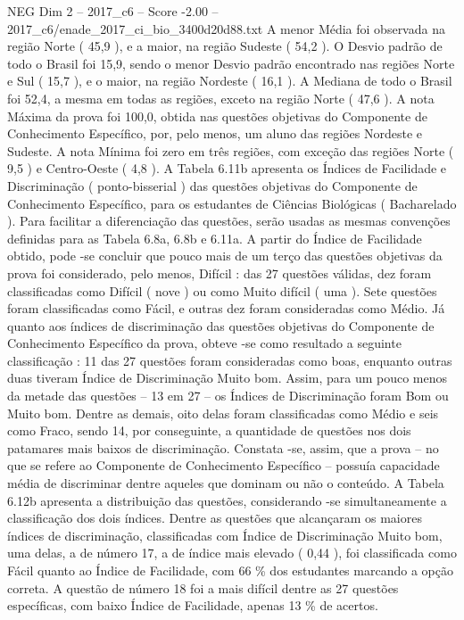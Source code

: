 \begin{textsample}{NEG Dim 2 – 2017\_c6 – Score -2.00 – 2017\_c6/enade\_2017\_ci\_bio\_3400d20d88.txt}
A menor Média foi observada na região Norte ( 45,9 ), e a maior, na região Sudeste ( 54,2 ).
O Desvio padrão de todo o Brasil foi 15,9, sendo o menor Desvio padrão encontrado nas regiões Norte e Sul ( 15,7 ), e o maior, na região Nordeste ( 16,1 ).
A Mediana de todo o Brasil foi 52,4, a mesma em todas as regiões, exceto na região Norte ( 47,6 ).
A nota Máxima da prova foi 100,0, obtida nas questões objetivas do Componente de Conhecimento Específico, por, pelo menos, um aluno das regiões Nordeste e Sudeste.
A nota Mínima foi zero em três regiões, com exceção das regiões Norte ( 9,5 ) e Centro-Oeste ( 4,8 ).
A Tabela 6.11b apresenta os Índices de Facilidade e Discriminação ( ponto-bisserial ) das questões objetivas do Componente de Conhecimento Específico, para os estudantes de Ciências Biológicas ( Bacharelado ).
Para facilitar a diferenciação das questões, serão usadas as mesmas convenções definidas para as Tabela 6.8a, 6.8b e 6.11a.
A partir do Índice de Facilidade obtido, pode -se concluir que pouco mais de um terço das questões objetivas da prova foi considerado, pelo menos, Difícil : das 27 questões válidas, dez foram classificadas como Difícil ( nove ) ou como Muito difícil ( uma ).
Sete questões foram classificadas como Fácil, e outras dez foram consideradas como Médio.
Já quanto aos índices de discriminação das questões objetivas do Componente de Conhecimento Específico da prova, obteve -se como resultado a seguinte classificação : 11 das 27 questões foram consideradas como boas, enquanto outras duas tiveram Índice de Discriminação Muito bom.
Assim, para um pouco menos da metade das questões – 13 em 27 – os Índices de Discriminação foram Bom ou Muito bom.
Dentre as demais, oito delas foram classificadas como Médio e seis como Fraco, sendo 14, por conseguinte, a quantidade de questões nos dois patamares mais baixos de discriminação.
Constata -se, assim, que a prova – no que se refere ao Componente de Conhecimento Específico – possuía capacidade média de discriminar dentre aqueles que dominam ou não o conteúdo.
A Tabela 6.12b apresenta a distribuição das questões, considerando -se simultaneamente a classificação dos dois índices.
Dentre as questões que alcançaram os maiores índices de discriminação, classificadas com Índice de Discriminação Muito bom, uma delas, a de número 17, a de índice mais elevado ( 0,44 ), foi classificada como Fácil quanto ao Índice de Facilidade, com 66 \% dos estudantes marcando a opção correta.
A questão de número 18 foi a mais difícil dentre as 27 questões específicas, com baixo Índice de Facilidade, apenas 13 \% de acertos.

\end{textsample}
